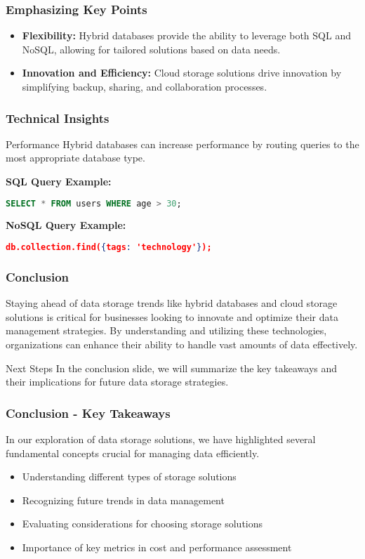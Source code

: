 \documentclass[aspectratio=169]{beamer}
\begin{document}
\begin{frame}[fragile]
    \frametitle{Emphasizing Key Points}
    \begin{itemize}
        \item \textbf{Flexibility:} Hybrid databases provide the ability to leverage both SQL and NoSQL, allowing for tailored solutions based on data needs.
        \item \textbf{Innovation and Efficiency:} Cloud storage solutions drive innovation by simplifying backup, sharing, and collaboration processes.
    \end{itemize}
\end{frame}

\begin{frame}[fragile]
    \frametitle{Technical Insights}
    \begin{block}{Performance}
        Hybrid databases can increase performance by routing queries to the most appropriate database type.
    \end{block}

    \textbf{SQL Query Example:}
    \begin{lstlisting}[language=SQL]
    SELECT * FROM users WHERE age > 30;
    \end{lstlisting}

    \textbf{NoSQL Query Example:}
    \begin{lstlisting}[language=json]
    db.collection.find({tags: 'technology'});
    \end{lstlisting}
\end{frame}

\begin{frame}[fragile]
    \frametitle{Conclusion}
    Staying ahead of data storage trends like hybrid databases and cloud storage solutions is critical for businesses looking to innovate and optimize their data management strategies. By understanding and utilizing these technologies, organizations can enhance their ability to handle vast amounts of data effectively.

    \begin{block}{Next Steps}
        In the conclusion slide, we will summarize the key takeaways and their implications for future data storage strategies.
    \end{block}
\end{frame}

\begin{frame}[fragile]
    \frametitle{Conclusion - Key Takeaways}
    In our exploration of data storage solutions, we have highlighted several fundamental concepts crucial for managing data efficiently.

    \begin{itemize}
        \item Understanding different types of storage solutions
        \item Recognizing future trends in data management
        \item Evaluating considerations for choosing storage solutions
        \item Importance of key metrics in cost and performance assessment
    \end{itemize}
\end{frame}
\end{document}
